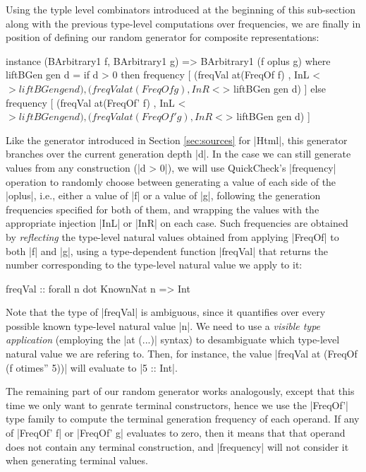 Using the typle level combinators introduced at the beginning of this
sub-section along with the previous type-level computations over frequencies, we
are finally in position of defining our random generator for composite
representations:

\begin{code}
instance (BArbitrary1 f, BArbitrary1 g)
  => BArbitrary1 (f oplus g) where
  liftBGen gen d =
    if d > 0
    then frequency
      [ (freqVal  at(FreqOf f) ,  InL <$> liftBGen gen d)
      , (freqVal  at(FreqOf g) ,  InR <$> liftBGen gen d) ]
    else frequency
      [ (freqVal  at(FreqOf' f) ,  InL <$> liftBGen gen d)
      , (freqVal  at(FreqOf' g) ,  InR <$> liftBGen gen d) ]
\end{code}

Like the generator introduced in Section \ref{sec:sources} for |Html|, this
generator branches over the current generation depth |d|.
%
In the case we can still generate values from any construction (|d > 0|), we
will use QuickCheck's |frequency| operation to randomly choose between
generating a value of each side of the |oplus|, i.e., either a value of |f| or a
value of |g|, following the generation frequencies specified for both of them,
and wrapping the values with the appropriate injection |InL| or |InR| on each
case.
%
Such frequencies are obtained by \emph{reflecting} the type-level natural values
obtained from applying |FreqOf| to both |f| and |g|, using a type-dependent
function |freqVal| that returns the number corresponding to the type-level
natural value we apply to it:

\begin{code}
freqVal :: forall n dot KnownNat n => Int
\end{code}

Note that the type of |freqVal| is ambiguous, since it quantifies over every
possible known type-level natural value |n|.
%
We need to use a \emph{visible type application} (employing the |at (...)|
syntax) to desambiguate which type-level natural value we are refering to.
%
Then, for instance, the value |freqVal at (FreqOf (f otimes'' 5))| will evaluate
to |5 :: Int|.

The remaining part of our random generator works analogously, except that this
time we only want to genrate terminal constructors, hence we use the |FreqOf'|
type family to compute the terminal generation frequency of each operand.
%
If any of |FreqOf' f| or |FreqOf' g| evaluates to zero, then it means that that
operand does not contain any terminal construction, and |frequency| will not
consider it when generating terminal values.

